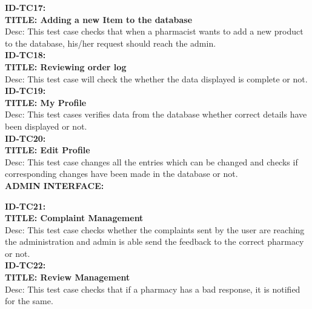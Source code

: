 \documentclass{article}
\begin{document}
 \textbf{ID-TC17:}\\
 \textbf{TITLE: Adding a new Item to the database}\\
Desc: This test case checks that when a pharmacist wants to add a new product to the database, his/her request should reach the admin.\\

 \textbf{ID-TC18:}\\
 \textbf{TITLE: Reviewing order log}\\
Desc:  This test case will check the whether the data displayed is complete or not.\\

 \textbf{ID-TC19:}\\
 \textbf{TITLE: My Profile}\\
Desc: This test cases verifies data from the database whether correct details have been displayed or not.\\

 \textbf{ID-TC20:}\\
 \textbf{TITLE: Edit Profile}\\
Desc: This test case changes all the entries which can be changed and checks if corresponding changes have been made in the database or not.\\

\vspace{0.5cm}
\textbf{ADMIN INTERFACE:}\\
\vspace{0.5cm}

 \textbf{ID-TC21:}\\
 \textbf{TITLE: Complaint Management}\\
Desc: This test case checks whether the complaints sent by the user are reaching the administration and admin is able send the feedback to the correct pharmacy or not.\\

 \textbf{ID-TC22:}\\
\textbf{TITLE: Review Management}\\
Desc: 	This test case checks that  if a pharmacy has a bad response, it is notified for the same.\\
\end{document}
